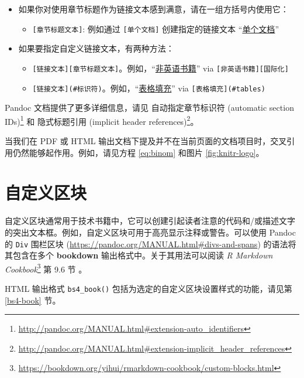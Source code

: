 \documentclass[
  12pt,
]{krantz}
\providecommand{\tightlist}{%
  \setlength{\itemsep}{0pt}\setlength{\parskip}{0pt}}
\renewcommand{\href}[2]{#2\footnote{\url{#1}}}
\theoremstyle{definition}
\theoremstyle{definition}
\theoremstyle{definition}
\theoremstyle{definition}
\theoremstyle{remark}
\begin{document}
\begin{itemize}
\tightlist
\item
  如果你对使用章节标题作为链接文本感到满意，请在一组方括号内使用它：

  \begin{itemize}
  \tightlist
  \item
    \texttt{{[}章节标题文本{]}}: 例如通过 \texttt{{[}单个文档{]}} 创建指定的链接文本 ``\protect\hyperlink{a-single-document}{单个文档}''
  \end{itemize}
\item
  如果要指定自定义链接文本，有两种方法：

  \begin{itemize}
  \tightlist
  \item
    \texttt{{[}链接文本{]}{[}章节标题文本{]}}。例如，``\protect\hyperlink{internationalization}{非英语书籍}'' via \texttt{{[}非英语书籍{]}{[}国际化{]}}
  \item
    \texttt{{[}链接文本{]}(\#标识符)}。例如，``\protect\hyperlink{tables}{表格填充}'' via \texttt{{[}表格填充{]}(\#tables)}
  \end{itemize}
\end{itemize}

Pandoc 文档提供了更多详细信息，请见 \href{http://pandoc.org/MANUAL.html\#extension-auto_identifiers}{自动指定章节标识符 (automatic section IDs)} 和 \href{http://pandoc.org/MANUAL.html\#extension-implicit_header_references}{隐式标题引用 (implicit header references)}。

当我们在 PDF 或 HTML 输出文档下提及并不在当前页面的文档项目时，交叉引用仍然能够起作用。例如，请见方程 \eqref{eq:binom} 和图片 \ref{fig:knitr-logo}。

\hypertarget{ux81eaux5b9aux4e49ux533aux5757}{%
\section{自定义区块}\label{ux81eaux5b9aux4e49ux533aux5757}}

自定义区块通常用于技术书籍中，它可以创建引起读者注意的代码和/或描述文字的突出文本框。例如，自定义区块可用于高亮显示注释或警告。可以使用 Pandoc 的 \texttt{Div} 围栏区块 (\url{https://pandoc.org/MANUAL.html\#divs-and-spans}) 的语法将其包含在多个 \textbf{bookdown} 输出格式中。关于其用法可以阅读 \href{https://bookdown.org/yihui/rmarkdown-cookbook/custom-blocks.html}{\emph{R Markdown Cookbook}} 第 9.6 节 \citep{rmarkdown2020}。

HTML 输出格式 \texttt{bs4\_book()} 包括为选定的自定义区块设置样式的功能，请见第 \ref{bs4-book} 节。
\end{document}
